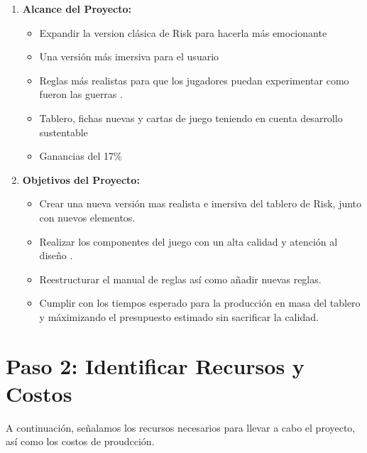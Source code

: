\documentclass[12pt]{article}
\begin{document}
\begin{enumerate}
	\item \textbf{Alcance del Proyecto:} 

	\begin{itemize}
		\item Expandir la version clásica de Risk para hacerla más emocionante

		\item Una versión más imersiva para el usuario

		\item Reglas más realistas para que los jugadores puedan experimentar como fueron las guerras
		.
		\item Tablero, fichas nuevas y cartas de juego teniendo en cuenta desarrollo sustentable

		\item Ganancias del 17\%

	\end{itemize}

	\item \textbf{Objetivos del Proyecto:}

	\begin{itemize}
		\item Crear una nueva versión mas realista e imersiva del tablero de Risk, junto con nuevos elementos.

		\item Realizar los componentes del juego con un alta calidad y atención al diseño
		.
		\item Reestructurar el manual de reglas así como añadir nuevas reglas.

		\item Cumplir con los tiempos esperado para la producción en masa del tablero y máximizando el presupuesto estimado sin sacrificar la calidad.

	\end{itemize}

\end{enumerate}


 \section*{Paso 2: Identificar Recursos y Costos}


A continuación, señalamos los recursos necesarios para llevar a cabo el proyecto, así como los costos de proudcción.
\end{document}
